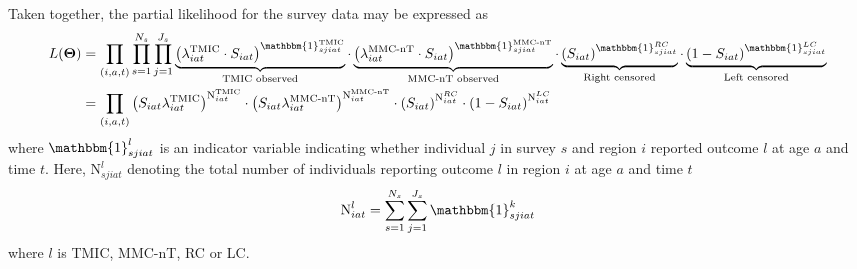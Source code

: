 \documentclass{article}
\begin{document}
\begin{appendix}
\noindent Taken together, the partial likelihood for the survey data may be expressed as 
\begin{eqnarray*}
	L(\boldsymbol{\Theta}) &= \displaystyle\prod_{(i,a,t)} \prod_{s=1}^{N_s} \prod_{j=1}^{J_s}  \underbrace{\left(\lambda^{\text{TMIC}}_{iat}\cdot S_{iat}\right)^{\mathbbm{1}^{\text{TMIC}}_{sjiat}}}_{\text{TMIC observed}} \cdot  \underbrace{ \left(\lambda^{\text{MMC-nT}}_{iat} \cdot S_{iat}\right)^{\mathbbm{1}^\text{MMC-nT}_{sjiat}}}_{\text{MMC-nT observed}} \cdot
	  \underbrace{\left(S_{iat}\right)^{\mathbbm{1}^{RC}_{sjiat}}}_{\text{Right censored}} \cdot \underbrace{\left(1-S_{iat}\right)^{\mathbbm{1}^{LC}_{sjiat}}}_{\text{Left censored}} \\
	   &= \displaystyle\prod_{(i,a,t)} \left(S_{iat}\lambda^{\text{TMIC}}_{iat}\right)^{\text{N}^{\text{TMIC}}_{iat}} \cdot \left(S_{iat}\lambda^{\text{MMC-nT}}_{iat}\right)^{\text{N}^\text{MMC-nT}_{iat}} \cdot
       \left(S_{iat}\right)^{\text{N}^{RC}_{iat}} \cdot \left(1-S_{iat}\right)^{\text{N}^{LC}_{iat}}
\end{eqnarray*}
where $\mathbbm{1}^{l}_{sjiat}$ is an indicator variable indicating whether individual $j$ in survey $s$ and region $i$ reported outcome $l$ at age $a$ and time $t$. Here, $\text{N}^{l}_{sjiat}$ denoting the total number of individuals reporting outcome $l$ in region $i$ at age $a$ and time $t$
\begin{equation*}
	\text{N}^{l}_{iat} = \sum_{s=1}^{N_s}\sum_{j=1}^{J_s} \mathbbm{1}^k_{sjiat}
\end{equation*}
where $l$ is TMIC, MMC-nT, RC or LC.


\end{appendix}
\end{document}
